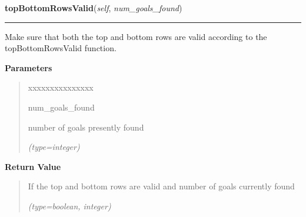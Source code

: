 \hspace{.8\funcindent}\begin{boxedminipage}{\funcwidth}

    \raggedright \textbf{topBottomRowsValid}(\textit{self}, \textit{num\_goals\_found})

    \vspace{-1.5ex}

    \rule{\textwidth}{0.5\fboxrule}
\setlength{\parskip}{2ex}
    Make sure that both the top and bottom rows are valid according to the 
    topBottomRowsValid function.

\setlength{\parskip}{1ex}
      \textbf{Parameters}
      \vspace{-1ex}

      \begin{quote}
        \begin{Ventry}{xxxxxxxxxxxxxxx}

          \item[num\_goals\_found]

          number of goals presently found

            {\it (type=integer)}

        \end{Ventry}

      \end{quote}

      \textbf{Return Value}
    \vspace{-1ex}

      \begin{quote}
      If the top and bottom rows are valid and number of goals currently 
      found

      {\it (type=boolean, integer)}

      \end{quote}

    \end{boxedminipage}

    \label{UnBlockMeSolver:Map:Map:Map:midRowsValid}

    \vspace{0.5ex}

